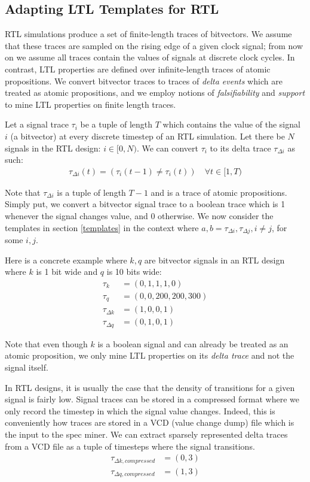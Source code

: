 \documentclass[acmlarge,11pt]{acmart}
\begin{document}
\subsection{Adapting LTL Templates for RTL}
RTL simulations produce a set of finite-length traces of bitvectors.
We assume that these traces are sampled on the rising edge of a given clock signal; from now on we assume all traces contain the values of signals at discrete clock cycles.
In contrast, LTL properties are defined over infinite-length traces of atomic propositions.
We convert bitvector traces to traces of \textit{delta events} which are treated as atomic propositions, and we employ notions of \textit{falsifiability} and \textit{support} to mine LTL properties on finite length traces.

Let a signal trace $\tau_i$ be a tuple of length $T$ which contains the value of the signal $i$ (a bitvector) at every discrete timestep of an RTL simulation.
Let there be $N$ signals in the RTL design: $i \in [0,N)$.
We can convert $\tau_i$ to its delta trace $\tau_{\Delta i}$ as such:
\begin{align*}
  \tau_{\Delta i}(t) = (\tau_i(t-1) \neq \tau_i(t)) \quad \forall t \in [1,T)
\end{align*}

Note that $\tau_{\Delta i}$ is a tuple of length $T-1$ and is a trace of atomic propositions.
Simply put, we convert a bitvector signal trace to a boolean trace which is 1 whenever the signal changes value, and 0 otherwise.
We now consider the templates in section \ref{templates} in the context where $a, b = \tau_{\Delta i}, \tau_{\Delta j}, i \neq j$, for some $i, j$.

Here is a concrete example where $k, q$ are bitvector signals in an RTL design where $k$ is 1 bit wide and $q$ is 10 bits wide:
\begin{align*}
  \tau_{k} &= (0, 1, 1, 1, 0) \\
  \tau_{q} &= (0, 0, 200, 200, 300) \\
  \tau_{\Delta k} &= (1, 0, 0, 1) \\
  \tau_{\Delta q} &= (0, 1, 0, 1)
\end{align*}

Note that even though $k$ is a boolean signal and can already be treated as an atomic proposition, we only mine LTL properties on its \textit{delta trace} and not the signal itself.

In RTL designs, it is usually the case that the density of transitions for a given signal is fairly low.
Signal traces can be stored in a compressed format where we only record the timestep in which the signal value changes.
Indeed, this is conveniently how traces are stored in a VCD (value change dump) file which is the input to the spec miner.
We can extract sparsely represented delta traces from a VCD file as a tuple of timesteps where the signal transitions. %
\begin{align*}
  \tau_{\Delta k, compressed} &= (0, 3) \\
  \tau_{\Delta q, compressed} &= (1, 3)
\end{align*}
\end{document}
